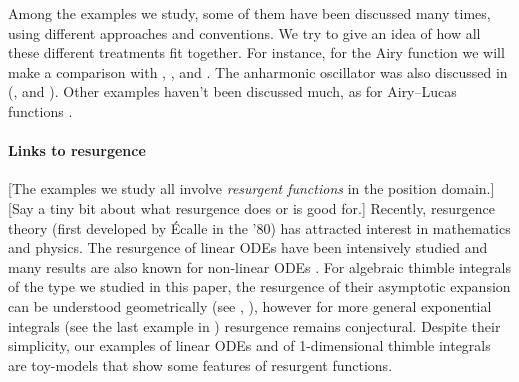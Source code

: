 \documentclass{article}
\theoremstyle{definition}
\theoremstyle{plain}
\newenvironment{todo}{\color{Coral}}{\color{black}}
\newenvironment{draft}{\color{SlateBlue}}{\color{black}}
\begin{document}
\begin{draft}
Among the examples we study, some of them have been discussed many times, using different approaches and conventions. We try to give an idea of how all these different treatments fit together. For instance, for the Airy function we will make a comparison with \cite[Section 2.2]{lectures-Marino}, \cite[Section 6.14]{diverg-resurg-i}, and \cite[Section 2.2]{kawai-takei}. \begin{todo}The anharmonic oscillator was also discussed in (\cite{bender-wu}, \cite[Appendix B]{aniceto2019primer} and \cite[Section 2.5.3]{sternin1995borel}).\end{todo} Other examples haven't been discussed much, as for Airy--Lucas functions \cite[Equation 3.2]{charbonnier22}.
%
\paragraph{Links to resurgence}
%
\begin{todo}[The examples we study all involve {\em resurgent functions} in the position domain.] [Say a tiny bit about what resurgence does or is good for.]\end{todo} Recently, resurgence theory (first developed by \'Ecalle in the '80) has attracted interest in mathematics and physics. The resurgence of linear ODEs have been intensively studied \cite{loday1994stokes,diverg-resurg--ii} and many results are also known for non-linear ODEs \cite{costin-PI,costin_kruskal,diverg-resurg-iii,schiappa-PI}. For algebraic thimble integrals of the type we studied in this paper, the resurgence of their asymptotic expansion can be understood geometrically (see \cite{Maxim_slide_ERC}, \cite[Section 6.2]{kontsevich2022analyticity}), however for more general exponential integrals (see the last example in \cite{Maxim_slide_ERC}) resurgence remains conjectural. Despite their simplicity, our examples of linear ODEs and of 1-dimensional thimble integrals are toy-models that show some features of resurgent functions. 


\end{draft}
\end{document}
